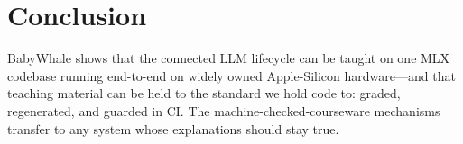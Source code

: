 \section{Conclusion}

BabyWhale shows that the connected LLM lifecycle can be taught on one MLX
codebase running end-to-end on widely owned Apple-Silicon hardware---and that
teaching material can be held to the standard we hold code to: graded,
regenerated, and guarded in CI. The machine-checked-courseware mechanisms
transfer to any system whose explanations should stay true.
